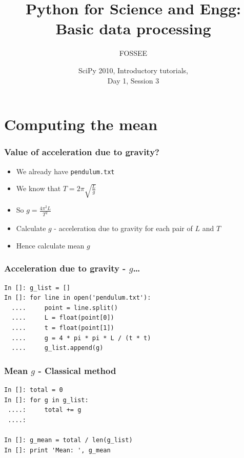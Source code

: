\documentclass[14pt,compress]{beamer}
\title[Statistics]{Python for Science and Engg:\\ Basic data processing}
\author[FOSSEE] {FOSSEE}
\institute[IIT Bombay] {Department of Aerospace Engineering\\IIT Bombay}
\date[] {SciPy 2010, Introductory tutorials,\\Day 1, Session 3}
\newcommand{\typ}[1]{\lstinline{#1}}
\begin{document}
\begin{frame}
  \maketitle
\end{frame}


\section{Computing the mean}
\begin{frame}
  \frametitle{Value of acceleration due to gravity?}
  \begin{itemize}
    \item We already have \typ{pendulum.txt}
    \item We know that $ T = 2\pi \sqrt{\frac{L}{g}} $
    \item So $ g = \frac{4 \pi^2 L}{T^2}  $
    \item Calculate $g$ - acceleration due to gravity for each pair of
        $L$ and $T$
    \item Hence calculate mean $g$
  \end{itemize}
\end{frame}

\begin{frame}[fragile]
  \frametitle{Acceleration due to gravity - $g$\ldots}
  \begin{lstlisting}
In []: g_list = []
In []: for line in open('pendulum.txt'):
  ....     point = line.split()
  ....     L = float(point[0])
  ....     t = float(point[1])
  ....     g = 4 * pi * pi * L / (t * t)
  ....     g_list.append(g)
  \end{lstlisting}
\end{frame}

\begin{frame}[fragile]
  \frametitle{Mean $g$ - Classical method}
  \begin{lstlisting}
In []: total = 0
In []: for g in g_list:
 ....:     total += g
 ....:

In []: g_mean = total / len(g_list)
In []: print 'Mean: ', g_mean
  \end{lstlisting}
\end{frame}
\end{document}
